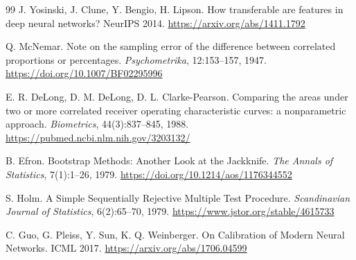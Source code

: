 \documentclass[11pt,a4paper]{article}
\begin{document}
\begin{thebibliography}{99}
J. Yosinski, J. Clune, Y. Bengio, H. Lipson.
\newblock How transferable are features in deep neural networks?
\newblock NeurIPS 2014.
\newblock \url{https://arxiv.org/abs/1411.1792}

Q. McNemar.
\newblock Note on the sampling error of the difference between correlated proportions or percentages.
\newblock \textit{Psychometrika}, 12:153--157, 1947.
\newblock \url{https://doi.org/10.1007/BF02295996}

E. R. DeLong, D. M. DeLong, D. L. Clarke-Pearson.
\newblock Comparing the areas under two or more correlated receiver operating characteristic curves: a nonparametric approach.
\newblock \textit{Biometrics}, 44(3):837--845, 1988.
\newblock \url{https://pubmed.ncbi.nlm.nih.gov/3203132/}

B. Efron.
\newblock Bootstrap Methods: Another Look at the Jackknife.
\newblock \textit{The Annals of Statistics}, 7(1):1--26, 1979.
\newblock \url{https://doi.org/10.1214/aos/1176344552}

S. Holm.
\newblock A Simple Sequentially Rejective Multiple Test Procedure.
\newblock \textit{Scandinavian Journal of Statistics}, 6(2):65--70, 1979.
\newblock \url{https://www.jstor.org/stable/4615733}

C. Guo, G. Pleiss, Y. Sun, K. Q. Weinberger.
\newblock On Calibration of Modern Neural Networks.
\newblock ICML 2017.
\newblock \url{https://arxiv.org/abs/1706.04599}

\end{thebibliography}
\end{document}
